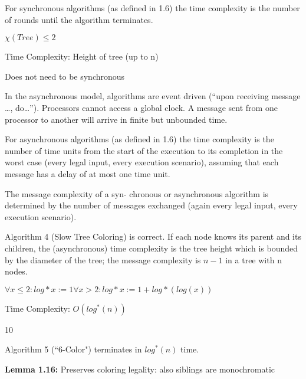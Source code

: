 {
	For synchronous algorithms (as defined in 1.6) the time complexity is the
	number of rounds until the algorithm terminates.
}

{
	$\chi (Tree) \leq 2$
}

{
	\begin{items}
		\item Time Complexity: Height of tree (up to n)
		\item Does not need to be synchronous
	\end{items}
}

{
	In the asynchronous model, algorithms are event driven (``upon receiving
	message \ldots, do\ldots''). Processors cannot access a global clock. A
	message sent from one processor to another will arrive in finite but unbounded
	time.
}

{
	For asynchronous algorithms (as defined in 1.6) the time complexity is the 
	number of time units from the start of the execution to its completion in the
	worst case (every legal input, every execution scenario), assuming that each
	message has a delay of at most one time unit. 
}

{
	The message complexity of a syn- chronous or asynchronous algorithm is
	determined by the number of messages exchanged (again every legal input, every
	execution scenario). 
}

{
	Algorithm 4 (Slow Tree Coloring) is correct. If each node knows its parent and
	its children, the (asynchronous) time complexity is the tree height which is
	bounded by the diameter of the tree; the message complexity is $n-1$ in
	a tree with n nodes.
}

{
	$\forall x \leq 2: log*x:=1 \forall x>2: log*x:=1+log*(log(x))$
}

{
	\begin{items}
		\item Time Complexity: $O(log^{*}(n))$ 
	\end{items}
}
{10}

{
	Algorithm 5 (``6-Color") terminates in $log^{*}(n)$ time.
}

{
	\begin{items}
		\item {\bf Lemma 1.16:} Preserves coloring legality: also siblings are
		monochromatic
	\end{items}
}

